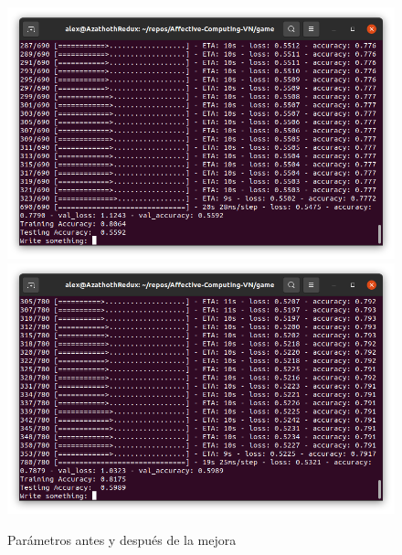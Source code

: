 \documentclass[a4]{sciposter}
\begin{document}
\begin{multicols}{3}
\begin{figure}
	\captionsetup{type=figure}
	\setcounter{figure}{2}
	\includegraphics[scale=0.6]{img/Test 2021-05.png}
	\includegraphics[scale=0.6]{img/Test 2021-07.png}
	\caption{Parámetros antes y después de la mejora}
\end{figure}

\begin{table}
\setcounter{table}{0} %
\captionsetup{type=table} %
\caption{Resultados de los experimentos antes y después de aplicarse la mejora}
\label{data}
\begin{center}
\end{center}
\end{table}


\end{multicols}
\end{document}
